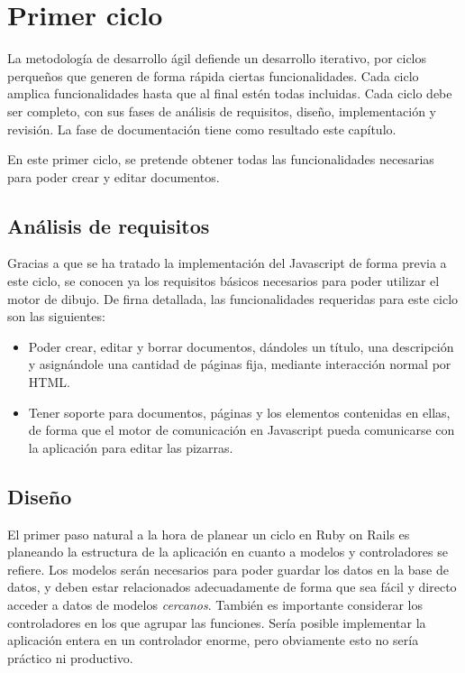\section{Primer ciclo} %
\label{sec:primer_ciclo}
La metodología de desarrollo ágil defiende un desarrollo iterativo, por ciclos perqueños que generen de forma rápida ciertas funcionalidades. Cada ciclo amplica funcionalidades hasta que al final estén todas incluidas. Cada ciclo debe ser completo, con sus fases de análisis de requisitos, diseño, implementación y revisión. La fase de documentación tiene como resultado este capítulo.

En este primer ciclo, se pretende obtener todas las funcionalidades necesarias para poder crear y editar documentos.

\subsection{Análisis de requisitos} %
\label{sub:análisis_de_requisitos}

Gracias a que se ha tratado la implementación del Javascript de forma previa a este ciclo, se conocen ya los requisitos básicos necesarios para poder utilizar el motor de dibujo. De firna detallada, las funcionalidades requeridas para este ciclo son las siguientes:

\begin{itemize}
  \item Poder crear, editar y borrar documentos, dándoles un título, una descripción y asignándole una cantidad de páginas fija, mediante interacción normal por HTML.
  \item Tener soporte para documentos, páginas y los elementos contenidas en ellas, de forma que el motor de comunicación en Javascript pueda comunicarse con la aplicación para editar las pizarras.
\end{itemize}


\subsection{Diseño} %
\label{sub:diseño}

El primer paso natural a la hora de planear un ciclo en Ruby on Rails es planeando la estructura de la aplicación en cuanto a modelos y controladores se refiere. Los modelos serán necesarios para poder guardar los datos en la base de datos, y deben estar relacionados adecuadamente de forma que sea fácil y directo acceder a datos de modelos \emph{cercanos}. También es importante considerar los controladores en los que agrupar las funciones. Sería posible implementar la aplicación entera en un controlador enorme, pero obviamente esto no sería práctico ni productivo.

